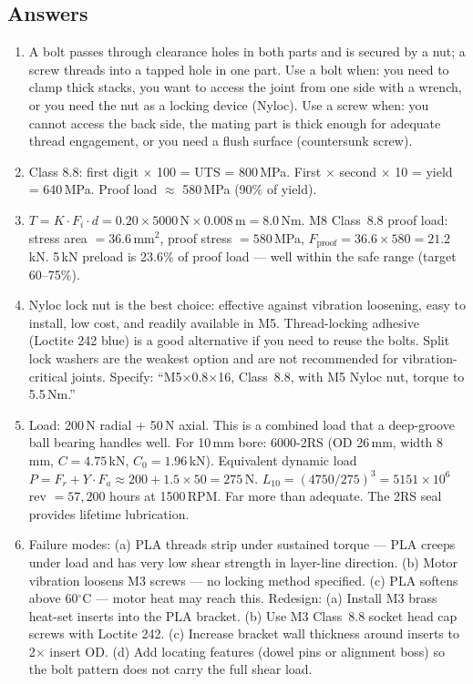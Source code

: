 \documentclass[11pt,letterpaper,twoside,openany]{book}
\newcommand{\degC}{\ensuremath{{}^{\circ}\text{C}}}
\begin{document}
\subsection{Answers}
\begin{enumerate}[leftmargin=1.5em]
\item A bolt passes through clearance holes in both parts and is secured by a nut; a screw threads into a tapped hole in one part. Use a bolt when: you need to clamp thick stacks, you want to access the joint from one side with a wrench, or you need the nut as a locking device (Nyloc). Use a screw when: you cannot access the back side, the mating part is thick enough for adequate thread engagement, or you need a flush surface (countersunk screw).

\item Class 8.8: first digit $\times$ 100 = UTS = 800\,MPa. First $\times$ second $\times$ 10 = yield = 640\,MPa. Proof load $\approx$ 580\,MPa (90\% of yield).

\item $T = K \cdot F_i \cdot d = 0.20 \times 5000\,\text{N} \times 0.008\,\text{m} = 8.0$\,Nm. M8 Class~8.8 proof load: stress area $= 36.6$\,mm$^2$, proof stress $= 580$\,MPa, $F_{\text{proof}} = 36.6 \times 580 = 21.2$\,kN. 5\,kN preload is 23.6\% of proof load --- well within the safe range (target 60--75\%).

\item Nyloc lock nut is the best choice: effective against vibration loosening, easy to install, low cost, and readily available in M5. Thread-locking adhesive (Loctite 242 blue) is a good alternative if you need to reuse the bolts. Split lock washers are the weakest option and are not recommended for vibration-critical joints. Specify: ``M5$\times$0.8$\times$16, Class~8.8, with M5 Nyloc nut, torque to 5.5\,Nm.''

\item Load: 200\,N radial + 50\,N axial. This is a combined load that a deep-groove ball bearing handles well. For 10\,mm bore: 6000-2RS (OD 26\,mm, width 8\,mm, $C = 4.75$\,kN, $C_0 = 1.96$\,kN). Equivalent dynamic load $P = F_r + Y \cdot F_a \approx 200 + 1.5 \times 50 = 275$\,N. $L_{10} = (4750/275)^3 = 5151 \times 10^6$ rev $= 57{,}200$ hours at 1500\,RPM. Far more than adequate. The 2RS seal provides lifetime lubrication.

\item Failure modes: (a) PLA threads strip under sustained torque --- PLA creeps under load and has very low shear strength in layer-line direction. (b) Motor vibration loosens M3 screws --- no locking method specified. (c) PLA softens above 60\degC{} --- motor heat may reach this. Redesign: (a) Install M3 brass heat-set inserts into the PLA bracket. (b) Use M3 Class~8.8 socket head cap screws with Loctite 242. (c) Increase bracket wall thickness around inserts to 2$\times$ insert OD. (d) Add locating features (dowel pins or alignment boss) so the bolt pattern does not carry the full shear load.


\end{enumerate}
\end{document}
